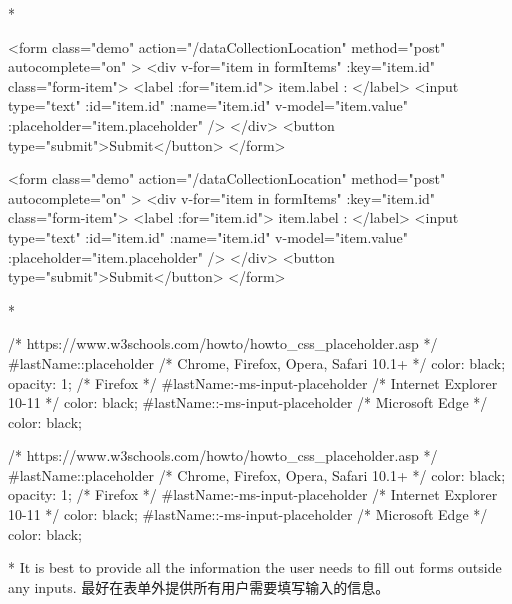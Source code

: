 \begin{paracol}{2} 
\switchcolumn[0]*%
\begin{codeHtml}
<form
  class="demo"
  action="/dataCollectionLocation"
  method="post"
  autocomplete="on"
>
  <div v-for="item in formItems" :key="item.id" class="form-item">
    <label :for="item.id">{{ item.label }}: </label>
    <input
      type="text"
      :id="item.id"
      :name="item.id"
      v-model="item.value"
      :placeholder="item.placeholder"
    />
  </div>
  <button type="submit">Submit</button>
</form>
\end{codeHtml}
\switchcolumn
\begin{codeHtml}
<form
  class="demo"
  action="/dataCollectionLocation"
  method="post"
  autocomplete="on"
>
  <div v-for="item in formItems" :key="item.id" class="form-item">
    <label :for="item.id">{{ item.label }}: </label>
    <input
      type="text"
      :id="item.id"
      :name="item.id"
      v-model="item.value"
      :placeholder="item.placeholder"
    />
  </div>
  <button type="submit">Submit</button>
</form>
\end{codeHtml}
\switchcolumn[0]*%
\begin{codeCss}
    /* https://www.w3schools.com/howto/howto_css_placeholder.asp */
    #lastName::placeholder {
      /* Chrome, Firefox, Opera, Safari 10.1+ */
      color: black;
      opacity: 1; /* Firefox */
    }
    #lastName:-ms-input-placeholder {
      /* Internet Explorer 10-11 */
      color: black;
    }
    #lastName::-ms-input-placeholder {
      /* Microsoft Edge */
      color: black;
    }
    \end{codeCss}
\switchcolumn
\begin{codeCss}
/* https://www.w3schools.com/howto/howto_css_placeholder.asp */
#lastName::placeholder {
  /* Chrome, Firefox, Opera, Safari 10.1+ */
  color: black;
  opacity: 1; /* Firefox */
}
#lastName:-ms-input-placeholder {
  /* Internet Explorer 10-11 */
  color: black;
}
#lastName::-ms-input-placeholder {
  /* Microsoft Edge */
  color: black;
}
\end{codeCss}
\switchcolumn[0]*%
It is best to provide all the information the user needs to fill out
forms outside any inputs.
\switchcolumn
最好在表单外提供所有用户需要填写输入的信息。
\end{paracol}


